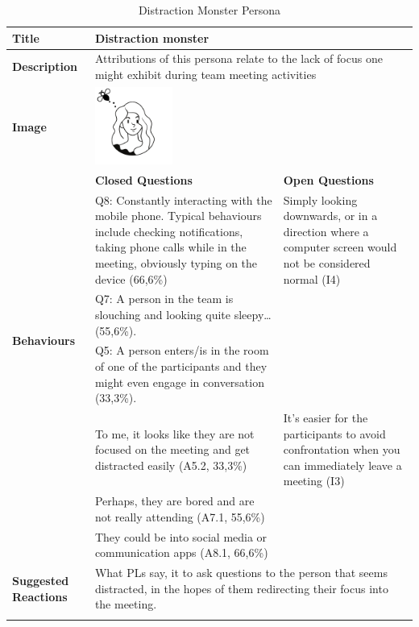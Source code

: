 \begin{longtable}[t]{ p{}  p{} p{} }
\caption{Distraction Monster Persona}
\label{tab:distraction}\\
\hline
\textbf{Title} & Distraction monster \\
    \hline
   \textbf{Description} &  \multicolumn{2}{p{.80\textwidth}}{Attributions of this persona relate to the lack of focus one might exhibit during team meeting activities} \\
   \hline
   \textbf{Image} &  \includegraphics[valign=t, width=1in, margin=0pt 3pt 0pt 3pt]{figures/Distraction.png} \\
   \hline
    & \textbf{Closed Questions} & \textbf{Open Questions} \\
     \hline
    \multirow{4}{4cm}{\textbf{Behaviours}}  & Q8: Constantly interacting with the mobile phone. Typical behaviours include checking notifications, taking phone calls while in the meeting, obviously typing on the device (66,6\%) & Simply looking downwards, or in a direction where a computer screen would not be considered normal (I4) \\
     & Q7: A person in the team is slouching and looking quite sleepy… (55,6\%). \\
     & Q5: A person enters/is in the room of one of the participants and they might even engage in conversation (33,3\%). \\
    \hline
    \multirow{4}{4cm}{\textbf{Attributions}}  & To me, it looks like they are not focused on the meeting and get distracted easily (A5.2, 33,3\%) & It's easier for the participants to avoid confrontation when you can immediately leave a meeting (I3) \\
     & Perhaps, they are bored and are not really attending (A7.1, 55,6\%) \\
     & They could be into social media or communication apps (A8.1, 66,6\%) \\
    \hline
     \textbf{Suggested Reactions} & \multicolumn{2}{p{.80\textwidth}}{What PLs say, it to ask questions to the person that seems distracted, in the hopes of them redirecting their focus into the meeting. } \\
    \hline
\label{tab:multicol}
\end{longtable}

